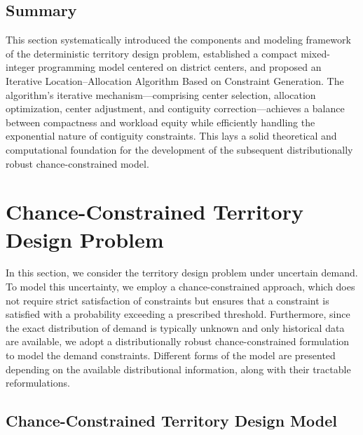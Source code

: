 \documentclass[preprint,12pt,authoryear]{elsarticle}
\begin{document}

\subsection{Summary}

This section systematically introduced the components and modeling framework of the deterministic territory design problem, established a compact mixed-integer programming model centered on district centers, and proposed an Iterative Location–Allocation Algorithm Based on Constraint Generation. 
The algorithm’s iterative mechanism—comprising center selection, allocation optimization, center adjustment, and contiguity correction—achieves a balance between compactness and workload equity while efficiently handling the exponential nature of contiguity constraints. 
This lays a solid theoretical and computational foundation for the development of the subsequent distributionally robust chance-constrained model.

\section{Chance-Constrained Territory Design Problem}

In this section, we consider the territory design problem under uncertain demand. To model this uncertainty, we employ a chance-constrained approach, which does not require strict satisfaction of constraints but ensures that a constraint is satisfied with a probability exceeding a prescribed threshold. Furthermore, since the exact distribution of demand is typically unknown and only historical data are available, we adopt a distributionally robust chance-constrained formulation to model the demand constraints. Different forms of the model are presented depending on the available distributional information, along with their tractable reformulations.

\subsection{Chance-Constrained Territory Design Model}
\end{document}
